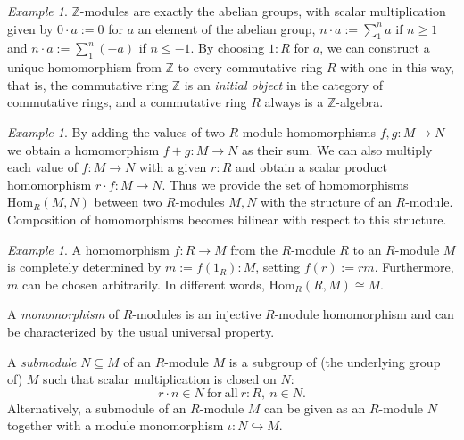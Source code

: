 \documentclass{amsart}
\theoremstyle{plain}
\numberwithin{equation}{section} %
\numberwithin{figure}{section} %
\theoremstyle{plain}
\theoremstyle{plain}
\theoremstyle{plain}
\theoremstyle{plain}
\theoremstyle{plain}
\theoremstyle{plain}
\theoremstyle{remark}
\theoremstyle{remark}
\theoremstyle{remark}
\newtheorem{exm}[thm]{Example}
\begin{document}
\begin{exm} \label{Z-mod-ex}
$\mathbb{Z}$-modules are exactly the abelian groups, with scalar multiplication given by $0 \cdot a := 0$ for $a$ an element of the abelian group, $n \cdot a := \sum_1^n a$ if $n \geq 1$ and $n \cdot a := \sum_1^n (-a)$ if $n \leq -1$. 
By choosing $1 : R$ for $a$, we can construct a unique homomorphism from $\mathbb{Z}$ to every commutative ring $R$ with one in this way, that is, the commutative ring $\mathbb{Z}$ is an \textit{initial object} in the category of commutative rings, and a commutative ring $R$ always is a $\mathbb{Z}$-algebra.
\end{exm}

\begin{exm}
By adding the values of two $R$-module homomorphisms $f, g : M \rightarrow N$ we obtain a homomorphism $f + g : M \rightarrow N$ as their sum. We can also multiply each value of $f : M \rightarrow N$ with a given $r : R$ and obtain a scalar product homomorphism $r \cdot f : M \rightarrow N$. Thus we provide the set of homomorphisms $\mathrm{Hom}_R(M, N)$ between two $R$-modules $M, N$ with the structure of an $R$-module. Composition of homomorphisms becomes bilinear with respect to this structure.
\end{exm}

\begin{exm} \label{hom-R-ex}
A homomorphism $f: R \rightarrow M$ from the $R$-module $R$ to an $R$-module $M$ is completely determined by $m := f(1_R) : M$, setting $f(r) := rm$. Furthermore, $m$ can be chosen arbitrarily. In different words, $\mathrm{Hom}_R(R, M) \cong M$. 
\end{exm}

A \textit{monomorphism} of $R$-modules is an injective $R$-module homomorphism and can be characterized by the usual universal property.

A \textit{submodule} $N \subseteq M$ of an $R$-module $M$ is a subgroup of (the underlying group of) $M$ such that scalar multiplication is closed on $N$: 
\[ r \cdot n \in N\ \mathrm{for\ all\ } r : R,\ n \in N. \]
Alternatively, a submodule of an $R$-module $M$ can be given as an $R$-module $N$ together with a module monomorphism $\iota : N \hookrightarrow M$.
\end{document}
